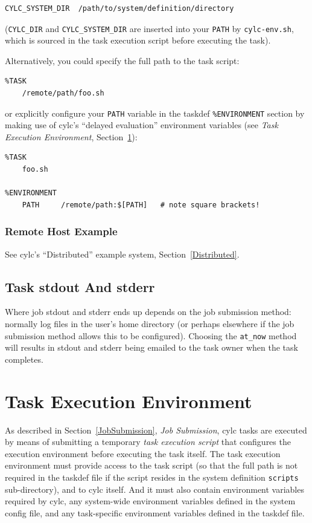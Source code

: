\documentclass[11pt,a4paper]{article}
\begin{document}
\begin{lstlisting}
CYLC_SYSTEM_DIR  /path/to/system/definition/directory
\end{lstlisting}

(\lstinline=CYLC_DIR=  and \lstinline=CYLC_SYSTEM_DIR= are inserted
into your \lstinline=PATH= by \lstinline=cylc-env.sh=, which is sourced
in the task execution script before executing the task).

Alternatively, you could specify the full path to the task script:

\begin{lstlisting}
%TASK
    /remote/path/foo.sh
\end{lstlisting}

or explicitly configure your \lstinline=PATH= variable in the taskdef
\lstinline=%ENVIRONMENT= section by making use of cylc's ``delayed
evaluation'' environment variables (see {\em Task Execution
Environment}, Section~\ref{TaskExecutionEnvironment}):

\begin{lstlisting}
%TASK
    foo.sh

%ENVIRONMENT
    PATH     /remote/path:$[PATH]   # note square brackets!
\end{lstlisting}

\subsubsection{Remote Host Example}

See cylc's ``Distributed'' example system, Section~\ref{Distributed}.


\subsection{Task stdout And stderr}
\label{TaskstdoutAndstderr}

Where job stdout and stderr ends up depends on the job submission
method: normally log files in the user's home directory (or perhaps
elsewhere if the job submission method allows this to be configured).
Choosing the \lstinline=at_now= method will results in stdout and
stderr being emailed to the task owner when the task completes.

\pagebreak
\section{Task Execution Environment}
\label{TaskExecutionEnvironment}

As described in Section~\ref{JobSubmission}, {\em Job Submission}, cylc
tasks are executed by means of submitting a temporary {\em task
execution script} that configures the execution environment before
executing the task itself.  The task execution environment must provide
access to the task script (so that the full path is not required in the
taskdef file if the script resides in the system definition
\lstinline=scripts= sub-directory), and to cylc itself. And it must also
contain environment variables required by cylc, any system-wide
environment variables defined in the system config file, and any
task-specific environment variables defined in the taskdef file.
\end{document}
